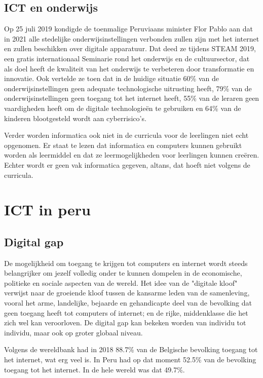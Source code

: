 \subsection{ICT en onderwijs}
Op 25 juli 2019 kondigde de toenmalige Peruviaans minister Flor Pablo aan dat in 2021 alle stedelijke onderwijsinstellingen verbonden zullen zijn met het internet en zullen beschikken over digitale apparatuur. Dat deed ze tijdens STEAM 2019, een gratis internationaal Seminarie rond het onderwijs en de cultuursector, dat als doel heeft de kwaliteit van het onderwijs te verbeteren door transformatie en innovatie. Ook vertelde ze toen dat in de huidige situatie 60\% van de onderwijsinstellingen geen adequate technologische uitrusting heeft, 79\% van de onderwijsinstellingen geen toegang tot het internet heeft, 55\% van de leraren geen vaardigheden heeft om de digitale technologieën te gebruiken en 64\% van de kinderen blootgesteld wordt aan cyberrisico's. \autocite{Ministerio de Educación}

Verder worden informatica ook niet in de curricula voor de leerlingen niet echt opgenomen. Er staat te lezen dat informatica en computers kunnen gebruikt worden als leermiddel en dat ze leermogelijkheden voor leerlingen kunnen creëren. Echter wordt er geen vak informatica gegeven, altans, dat hoeft niet volgens de curricula. \autocite{MINEDU2016}

\section{ICT in peru}
\subsection{Digital gap}
De mogelijkheid om toegang te krijgen tot computers en internet wordt steeds belangrijker om jezelf volledig onder te kunnen dompelen in de economische, politieke en sociale aspecten van de wereld. Het idee van de "digitale kloof" verwijst naar de groeiende kloof tussen de kansarme leden van de samenleving, vooral het arme, landelijke, bejaarde en gehandicapte deel van de bevolking dat geen toegang heeft tot computers of internet; en de rijke, middenklasse die het zich wel kan veroorloven. De digital gap kan bekeken worden van individu tot individu, maar ook op groter globaal niveau. \autocite{Marichick2000}

Volgens de wereldbank had in 2018 88.7\% van de Belgische bevolking toegang tot het internet, wat erg veel is. In Peru had op dat moment 52.5\% van de bevolking toegang tot het internet. In de hele wereld was dat 49.7\%. \autocite{WereldBank2018}

